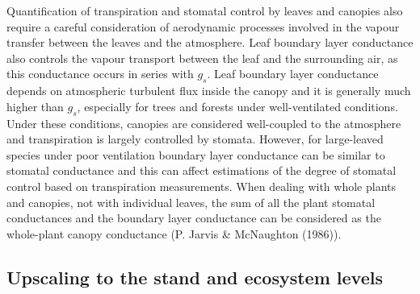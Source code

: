 \documentclass[11pt,twoside]{reedthesis}
\begin{document}
Quantification of transpiration and stomatal control by leaves and
canopies also require a careful consideration of aerodynamic processes
involved in the vapour transfer between the leaves and the atmosphere.
Leaf boundary layer conductance also controls the vapour transport
between the leaf and the surrounding air, as this conductance occurs in
series with \(g_s\). Leaf boundary layer conductance depends on
atmospheric turbulent flux inside the canopy and it is generally much
higher than \(g_s\), especially for trees and forests under
well-ventilated conditions. Under these conditions, canopies are
considered well-coupled to the atmosphere and transpiration is largely
controlled by stomata. However, for large-leaved species under poor
ventilation boundary layer conductance can be similar to stomatal
conductance and this can affect estimations of the degree of stomatal
control based on transpiration measurements. When dealing with whole
plants and canopies, not with individual leaves, the sum of all the
plant stomatal conductances and the boundary layer conductance can be
considered as the whole-plant canopy conductance (P. Jarvis \&
McNaughton (1986)).\par

\subsection{Upscaling to the stand and ecosystem
levels}\label{upscaling-to-the-stand-and-ecosystem-levels}
\end{document}
